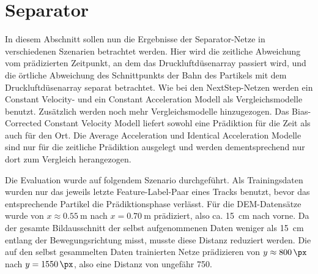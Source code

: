 


\section{Separator}





In diesem Abschnitt sollen nun die Ergebnisse der Separator-Netze in verschiedenen Szenarien betrachtet werden.
Hier wird die zeitliche Abweichung vom prädizierten Zeitpunkt, an dem das Druckluftdüsenarray passiert wird, und die örtliche Abweichung des Schnittpunkts der Bahn des Partikels mit dem Druckluftdüsenarray separat betrachtet.
Wie bei den NextStep-Netzen werden ein Constant Velocity- und ein Constant Acceleration Modell 
als Vergleichsmodelle benutzt. 
Zusätzlich werden noch mehr Vergleichsmodelle hinzugezogen. 
Das Bias-Corrected Constant Velocity Modell liefert sowohl eine Prädiktion für die Zeit als auch für den Ort.
Die Average Acceleration und Identical Acceleration Modelle sind nur für die zeitliche Prädiktion ausgelegt und werden dementsprechend nur dort zum Vergleich herangezogen.

Die Evaluation wurde auf folgendem Szenario durchgeführt.
Als Trainingsdaten wurden nur das jeweils letzte Feature-Label-Paar eines Tracks benutzt, bevor das entsprechende Partikel die Prädiktionsphase verlässt.
Für die DEM-Datensätze wurde von \(x \approx \SI{0.55}{\meter}\) nach \(x = \SI{0.70}{\meter}\) prädiziert, also ca. \SI{15}{\centi\meter} nach vorne.
Da der gesamte Bildausschnitt der selbst aufgenommenen Daten weniger als \SI{15}{\centi\meter} entlang der Bewegungsrichtung misst, musste diese Distanz reduziert werden.
Die auf den selbst gesammelten Daten trainierten Netze prädizieren von \(y \approx \SI{800}{\px}\) nach \(y = \SI{1550}{\px}\), also eine Distanz von ungefähr \SI{750}{\px}.


